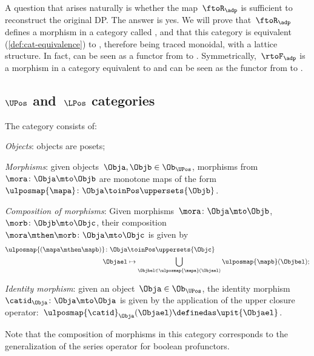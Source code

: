 A question that arises naturally is whether the map~$\ftoR_\adp$ is sufficient to reconstruct the original DP.
The answer is yes.
We will prove that~$\ftoR_\adp$ defines a morphism in a category called \UPos, and that this category is equivalent (\cref{def:cat-equivalence}) to \DP, therefore being traced monoidal, with a lattice structure.
In fact, \FixFunMinRes can be seen as a functor from \DP to \UPos.
Symmetrically,~$\rtoF_\adp$ is a morphism in a category \LPos equivalent to \DP and \FixResMaxFun can be seen as the functor from \DP to \LPos.

\subsection{$\UPos$ and~$\LPos$ categories}

\begin{definition}
    \label{def:upos_cat}
    The category \UPos consists of:
    \begin{compactenum}
        \item \emph{Objects}: objects are posets;
        \item \emph{Morphisms}: given objects~$\Obja,\Objb\in \Ob_{\UPos}$, morphisms from~$\mora\colon \Obja \mto \Objb$ are monotone maps of the form~$\ulposmap{\mapa} \colon \Obja \toinPos \uppersets{\Objb}$.
        \item \emph{Composition of morphisms}: Given morphisms~$\mora\colon \Obja \mto \Objb$,~$\morb\colon \Objb\mto \Objc$, their composition~$\mora\mthen \morb\colon \Obja\mto \Objc$ is given by
        \begin{equation}
            \begin{aligned}
                \ulposmap{(\mapa \mthen \mapb)} \colon \Obja&\toinPos \uppersets{\Objc}\\
                \Objael&\mapsto \bigcup_{\Objbel\in \ulposmap{\mapa}(\Objael)}\ulposmap{\mapb}(\Objbel);
            \end{aligned}
        \end{equation}
        \item \emph{Identity morphism}: given an object~$\Obja\in \Ob_{\UPos}$, the identity morphism~$\catid_\Obja \colon \Obja \mto \Obja$ is given by the application of the upper closure operator:~$\ulposmap{\catid}_\Obja(\Objael)\definedas \upit\{\Objael\}$.
    \end{compactenum}
\end{definition}

\begin{remark}
    Note that the composition of morphisms in this category corresponds to the generalization of the series operator for boolean profunctors.
\end{remark}

